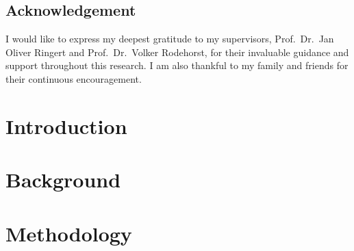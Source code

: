 \begin{frontmatter}
       
    \chapter*{Acknowledgement}
    I would like to express my deepest gratitude to my supervisors, Prof.\ Dr.\ Jan Oliver Ringert and Prof.\ Dr.\ Volker Rodehorst, for their invaluable guidance and support throughout this research. I am also thankful to my family and friends for their continuous encouragement.
    
    \tableofcontents
    \listoffigures
    \listoftables
    
    
    
\end{frontmatter}

% 

% 

\chapter{Introduction} \label{Introduction}


\chapter{Background} \label{Background}


\chapter{Methodology} \label{Methodology}



